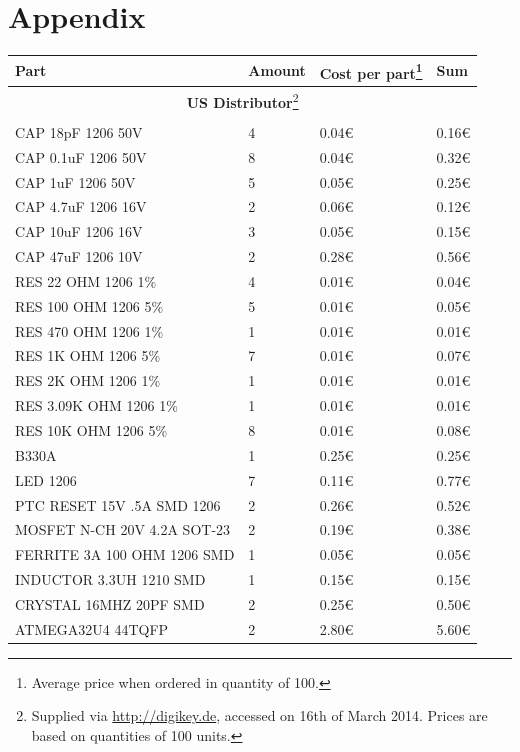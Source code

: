 \documentclass[11pt,a4paper]{article}
\begin{document}
\section{Appendix}


\begin{longtable}{p{}p{}p{}p{}}
\toprule
Part & Amount & Cost per part\footnote{Average price when ordered in quantity of 100.} & Sum \\
\midrule
\multicolumn{4}{c}{\textbf{US Distributor}\footnote{Supplied via \url{http://digikey.de}, accessed on 16th of March 2014. Prices are based on quantities of 100 units.}}\\
\\
CAP 18pF 1206 50V & 4 & 0.04\euro & 0.16\euro \\ 
CAP 0.1uF 1206 50V & 8 & 0.04\euro & 0.32\euro \\
CAP 1uF 1206 50V & 5 & 0.05\euro & 0.25\euro \\
CAP 4.7uF 1206 16V & 2 & 0.06\euro & 0.12\euro \\
CAP 10uF 1206 16V & 3 & 0.05\euro & 0.15\euro \\
CAP 47uF 1206 10V & 2 & 0.28\euro & 0.56\euro \\
RES 22 OHM 1206 1\% & 4 &  0.01\euro & 0.04\euro \\
RES 100 OHM 1206 5\% & 5 & 0.01\euro & 0.05\euro \\
RES 470 OHM 1206 1\% & 1 & 0.01\euro & 0.01\euro \\
RES 1K OHM 1206 5\% & 7 & 0.01\euro & 0.07\euro \\
RES 2K OHM 1206 1\% & 1 & 0.01\euro & 0.01\euro \\
RES 3.09K OHM 1206 1\% & 1 & 0.01\euro & 0.01\euro \\
RES 10K OHM 1206 5\% & 8 & 0.01\euro & 0.08\euro \\
B330A & 1 & 0.25\euro & 0.25\euro \\
LED 1206 & 7 & 0.11\euro & 0.77\euro \\
PTC RESET 15V .5A SMD 1206 & 2 & 0.26\euro & 0.52\euro \\
MOSFET N-CH 20V 4.2A SOT-23 & 2 & 0.19\euro & 0.38\euro \\
FERRITE 3A 100 OHM 1206 SMD & 1 & 0.05\euro & 0.05\euro \\
INDUCTOR 3.3UH 1210 SMD & 1 & 0.15\euro & 0.15\euro \\
CRYSTAL 16MHZ 20PF SMD & 2 & 0.25\euro & 0.50\euro \\
ATMEGA32U4 44TQFP & 2 & 2.80\euro & 5.60\euro \\

\end{longtable}
\end{document}
